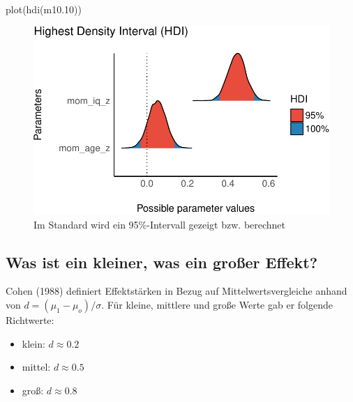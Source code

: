 \documentclass[
  a4paper,
  DIV=11]{scrreprt}
\newenvironment{Shaded}{\begin{snugshade}}{\end{snugshade}}
\newcommand{\FloatTok}[1]{\textcolor[rgb]{0.68,0.00,0.00}{#1}}
\newcommand{\FunctionTok}[1]{\textcolor[rgb]{0.28,0.35,0.67}{#1}}
\newcommand{\NormalTok}[1]{\textcolor[rgb]{0.00,0.23,0.31}{#1}}
\providecommand{\tightlist}{%
  \setlength{\itemsep}{0pt}\setlength{\parskip}{0pt}}\usepackage{longtable,booktabs,array}
\theoremstyle{definition}
\theoremstyle{remark}
\begin{document}
\begin{Shaded}
\begin{Highlighting}[]
\FunctionTok{plot}\NormalTok{(}\FunctionTok{hdi}\NormalTok{(m10}\FloatTok{.10}\NormalTok{))}
\end{Highlighting}
\end{Shaded}

\begin{figure}[H]

{\centering \includegraphics{./metrische-AV_files/figure-pdf/fig-m1010hdi-1.pdf}

}

\caption{\label{fig-m1010hdi}Im Standard wird ein 95\%-Intervall gezeigt
bzw. berechnet}

\end{figure}

\hypertarget{was-ist-ein-kleiner-was-ein-grouxdfer-effekt}{%
\subsection{Was ist ein kleiner, was ein großer
Effekt?}\label{was-ist-ein-kleiner-was-ein-grouxdfer-effekt}}

Cohen (1988) definiert Effektstärken in Bezug auf Mittelwertsvergleiche
anhand von \(d=(\mu_1 - \mu_o) / \sigma\). Für kleine, mittlere und
große Werte gab er folgende Richtwerte:

\begin{itemize}
\tightlist
\item
  klein: \(d \approx 0.2\)
\item
  mittel: \(d \approx 0.5\)
\item
  groß: \(d \approx 0.8\)
\end{itemize}
\end{document}
